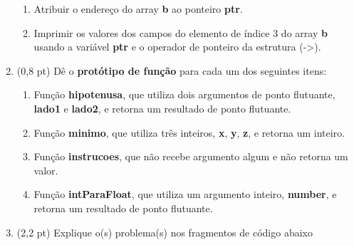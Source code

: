 \documentclass[a4paper,10pt]{article}
\begin{document}
\begin{multicols*}{2}
\begin{enumerate}
\begin{enumerate}
    \item Atribuir o endereço do array \textbf{b} ao ponteiro \textbf{ptr}.

    \item Imprimir os valores dos campos do elemento de índice 3 do array \textbf{b} usando a variável \textbf{ptr} e o operador de ponteiro da estrutura (->).

  \end{enumerate}

  \item (0,8 pt) Dê o \textbf{protótipo de função} para cada um dos seguintes itens:

    \begin{enumerate}
      \item Função \textbf{hipotenusa}, que utiliza dois argumentos de ponto flutuante, \textbf{lado1} e \textbf{lado2}, e retorna um resultado de ponto flutuante.

      \item Função \textbf{minimo}, que utiliza três inteiros, \textbf{x}, \textbf{y}, \textbf{z}, e retorna um inteiro.

      \item Função \textbf{instrucoes}, que não recebe argumento algum e não retorna um valor.

      \item Função \textbf{intParaFloat}, que utiliza um argumento inteiro, \textbf{number}, e retorna um resultado de ponto flutuante.
    \end{enumerate}

  \vfill\null
  \pagebreak
  \vspace*{0.0cm}

  \item (2,2 pt) Explique o(s) problema(s) nos fragmentos de código abaixo



\end{enumerate}
\end{multicols*}
\end{document}
